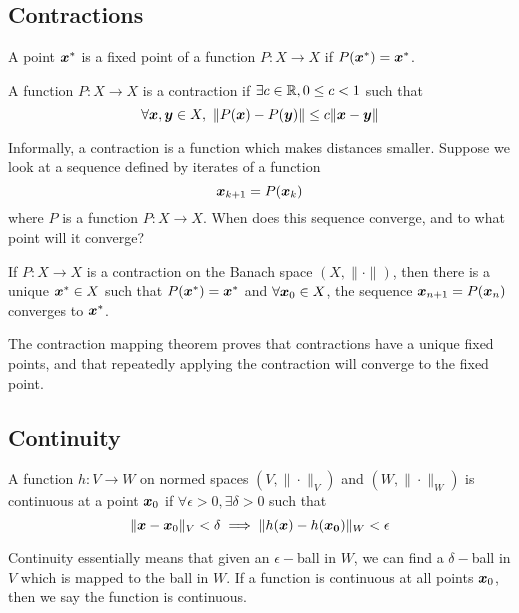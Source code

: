 \subsection{Contractions}
\begin{definition}
	A point $\boldsymbol{x}^*$ is a fixed point of a function $P:X\to X$ if
	$P(\boldsymbol{x}^*)=\boldsymbol{x}^*$.
	\label{defn:fixed-point}
\end{definition}
\begin{definition}
	A function $P:X\to X$ is a contraction if $\exists c\in\mathbb{R}, 0 \leq c < 1$ 
	such that \[
		\forall \boldsymbol{x},\boldsymbol{y}\in X,\ \|P(\boldsymbol{x}) - P(\boldsymbol{y})\| \leq c
		\|\boldsymbol{x}-\boldsymbol{y}\|
	\]
	\label{defn:contraction}
\end{definition}
Informally, a contraction is a function which makes distances smaller. Suppose we look at a sequence defined by iterates of a function \[
	\boldsymbol{x}_{k+1} = P(\boldsymbol{x}_k)
\]
where $P$ is a function $P:X\to X$. When does this sequence converge, and to
what point will it converge?
\begin{theorem}
	If $P:X\to X$ is a contraction on the Banach space $(X, \|\cdot\|)$, then
	there is a unique $\boldsymbol{x}^*\in X$ such that $P(\boldsymbol{x}^*) = \boldsymbol{x}^*$ and
	$\forall \boldsymbol{x}_0\in X$, the sequence $\boldsymbol{x}_{n+1} = P(\boldsymbol{x}_n)$ converges to
	$\boldsymbol{x}^*$.
	\label{thm:contraction-mapping}
\end{theorem}
The contraction mapping theorem proves that contractions have a unique fixed
points, and that repeatedly applying the contraction will converge to the fixed
point.

\subsection{Continuity}
\begin{definition}
	A function $h:V\to W$ on normed spaces $(V, \|\cdot\|_V)$ and $(W,
	\|\cdot\|_W)$ is continuous at a point $\boldsymbol{x}_0$ if $\forall \epsilon > 0,
	\exists \delta > 0$ such that \[
		\|\boldsymbol{x}-\boldsymbol{x}_0\|_V < \delta \implies \|h(\boldsymbol{x}) - h(\boldsymbol{x_0})\|_W < \epsilon
	\]
	\label{thm:continuity}
\end{definition}
Continuity essentially means that given an $\epsilon-$ball in $W$, we can find a
$\delta-$ball in $V$ which is mapped to the ball in $W$.
If a function is continuous at all points $\boldsymbol{x}_0$, then we say the function
is continuous.

